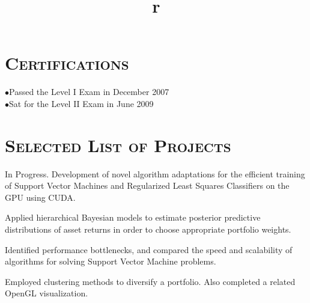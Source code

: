 \begin{resume}
\section{\textsc{Certifications}}
\begin{position}
$\bullet$Passed the Level I Exam in December 2007 \\
$\bullet$Sat for the Level II Exam in June 2009  
\end{position}


\section{\textsc{Selected List of Projects}}
\begin{position}
In Progress. Development of novel algorithm adaptations for the efficient training of Support Vector Machines and Regularized Least Squares Classifiers on the GPU using CUDA.
\end{position}

\begin{position}
Applied hierarchical Bayesian models to estimate posterior predictive distributions of asset returns in order to choose appropriate portfolio weights.
\end{position}

\begin{position}
Identified performance bottlenecks, and compared the speed and scalability of algorithms for solving Support Vector Machine problems.
\end{position}	

\begin{position}
Employed clustering methods to diversify a portfolio.  Also completed a related OpenGL visualization.
\end{position}


\begin{formatb}
  \title{r}\\
  \\
  \body\\
\end{formatb}


\end{resume}
